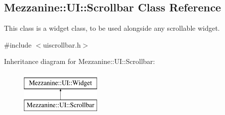 \hypertarget{classMezzanine_1_1UI_1_1Scrollbar}{
\subsection{Mezzanine::UI::Scrollbar Class Reference}
\label{classMezzanine_1_1UI_1_1Scrollbar}
}


This class is a widget class, to be used alongside any scrollable widget.  




{\ttfamily \#include $<$uiscrollbar.h$>$}

Inheritance diagram for Mezzanine::UI::Scrollbar:\begin{figure}[H]
\begin{center}
\leavevmode
\includegraphics[height=2.000000cm]{classMezzanine_1_1UI_1_1Scrollbar}
\end{center}
\end{figure}
